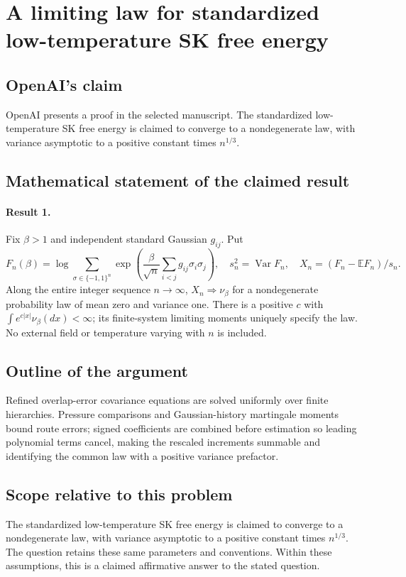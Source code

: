 \documentclass[11pt]{article}
\begin{document}
\section*{A limiting law for standardized low-temperature SK free energy}

\subsection{OpenAI's claim}
OpenAI presents a proof in the selected manuscript. The standardized low-temperature SK free energy is claimed to converge to a nondegenerate law, with variance asymptotic to a positive constant times $n^{1/3}$.

\subsection{Mathematical statement of the claimed result}
\paragraph{Result 1.} Fix $\beta>1$ and independent standard Gaussian $g_{ij}$. Put
\[
 F_n(\beta)=\log\sum_{\sigma\in\{-1,1\}^n}
 \exp\left(\frac\beta{\sqrt n}\sum_{i<j}g_{ij}\sigma_i\sigma_j\right),\quad
 s_n^2=\operatorname{Var}F_n,\quad X_n=(F_n-\mathbb EF_n)/s_n.
\]
Along the entire integer sequence $n\to\infty$, $X_n\Longrightarrow\nu_\beta$ for a nondegenerate probability law of mean zero and variance one. There is a positive $c$ with $\int e^{c|x|}\nu_\beta(dx)<\infty$; its finite-system limiting moments uniquely specify the law. No external field or temperature varying with $n$ is included.

\subsection{Outline of the argument}
Refined overlap-error covariance equations are solved uniformly over finite hierarchies. Pressure comparisons and Gaussian-history martingale moments bound route errors; signed coefficients are combined before estimation so leading polynomial terms cancel, making the rescaled increments summable and identifying the common law with a positive variance prefactor.

\subsection{Scope relative to this problem}
The standardized low-temperature SK free energy is claimed to converge to a nondegenerate law, with variance asymptotic to a positive constant times $n^{1/3}$. The question retains these same parameters and conventions. Within these assumptions, this is a claimed affirmative answer to the stated question.
\end{document}
